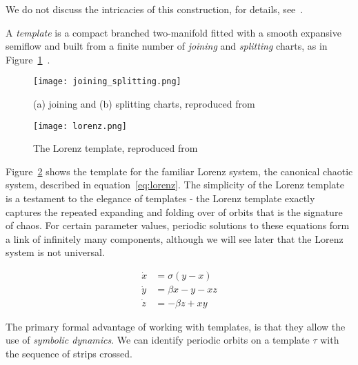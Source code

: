 \documentclass[paper.tex]{subfiles}
\begin{document}
We do not discuss the intricacies of this construction, for details, see~\cite{bw1983b}.


\begin{definition}[Template]
  A \emph{template} is a compact branched two-manifold fitted with a smooth expansive semiflow and built from a finite number of \emph{joining} and \emph{splitting} charts, as in Figure~\ref{fig:joinsplit}~\cite{knottyode}.\label{def:template}
\end{definition}


\begin{figure}[h]
  \centering
  \texttt{[image: joining\_splitting.png]}
  \caption[what goes here]{(a) joining and (b) splitting charts, reproduced from~\cite{knottyode}\protect\footnotemark}\label{fig:joinsplit}
\end{figure}


\begin{figure}[h]
  \centering
  \texttt{[image: lorenz.png]}
  \caption{The Lorenz template, reproduced from~\cite{knottyode}}\label{fig:lorenz}
\end{figure}

Figure~\ref{fig:lorenz} shows the template for the familiar Lorenz system, the canonical chaotic system, described in equation~\ref{eq:lorenz}. The simplicity of the Lorenz template is a testament to the elegance of
templates - the Lorenz template exactly captures the repeated expanding and folding over of orbits that is the signature of chaos. For certain parameter values, periodic solutions to these equations form a link of infinitely
many components, although we will see later that the Lorenz system is not universal.

\begin{align}
  \label{eq:lorenz}
  \dot{x} &= \sigma(y - x ) \\
  \dot{y} &= \beta x - y - x z \\
  \dot{z} &= - \beta z + x y
\end{align}

The primary formal advantage of working with templates, is that they allow the use of \emph{symbolic dynamics}. We can identify periodic orbits on a template $\tau$ with the sequence of strips crossed.
\end{document}
